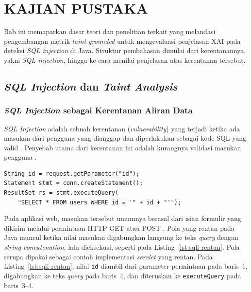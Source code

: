\chapter{KAJIAN PUSTAKA}
\label{chap:kajian-pustaka}

Bab ini memaparkan dasar teori dan penelitian terkait yang melandasi pengembangan 
metrik \textit{taint-grounded} untuk mengevaluasi penjelasan XAI pada deteksi \textit{SQL injection} di Java. 
Struktur pembahasan dimulai dari kerentanannya, yakni \textit{SQL injection}, hingga ke cara menilai penjelasan 
atas kerentanan tersebut. 

\section{\textit{SQL Injection} dan \textit{Taint Analysis}}
\label{sec:sqli-taint}

\subsection{\textit{SQL Injection} sebagai Kerentanan Aliran Data}
\label{sec:sqli-aliran-data}
\textit{SQL Injection} adalah sebuah kerentanan (\textit{vulnerability}) yang terjadi ketika ada
masukan dari pengguna yang dianggap dan diperlakukan sebagai kode SQL yang valid \autocite{halfond2006}. Penyebab utama dari kerentanan
ini adalah kurangnya validasi masukan pengguna \autocite{halfond2006}. 

\begin{lstlisting}[caption={Contoh kode Java yang rentan terhadap \textit{SQL injection}}, label={lst:sqli-rentan}]
String id = request.getParameter("id");
Statement stmt = conn.createStatement();
ResultSet rs = stmt.executeQuery(
    "SELECT * FROM users WHERE id = '" + id + "'");
\end{lstlisting}

Pada aplikasi web, masukan tersebut umumnya berasal dari isian formulir
yang dikirim melalui permintaan HTTP GET atau POST \autocite{halfond2006}.
Pola yang rentan pada Java muncul ketika nilai masukan digabungkan langsung ke teks \textit{query}
dengan \textit{string concatenation}, lalu dieksekusi, seperti pada Listing~\ref{lst:sqli-rentan}.
Pola serupa dipakai \textcite{halfond2006} sebagai contoh implementasi \textit{servlet} yang rentan.
Pada Listing~\ref{lst:sqli-rentan}, nilai \lstinline|id| diambil dari parameter permintaan pada baris~1,
digabungkan ke teks \textit{query} pada baris~4,
dan diteruskan ke \lstinline|executeQuery| pada baris~3--4.

